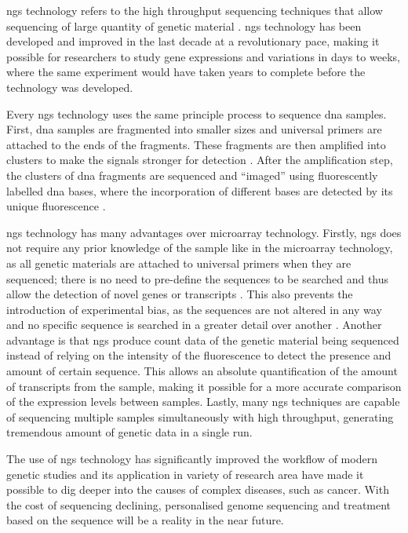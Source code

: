 \Gls{ngs} technology refers to the high throughput sequencing techniques that allow sequencing of large quantity of genetic material \citep{Metzker2010}.
\gls{ngs} technology has been developed and improved in the last decade at a revolutionary pace, making it possible for researchers to study gene expressions and variations in days to weeks, where the same experiment would have taken years to complete before the technology was developed.

Every \gls{ngs} technology uses the same principle process to sequence \acrshort{dna} samples.
First, \acrshort{dna} samples are fragmented into smaller sizes and universal primers are attached to the ends of the fragments.
These fragments are then amplified into clusters to make the signals stronger for detection \citep{Metzker2010}.
After the amplification step, the clusters of \acrshort{dna} fragments are sequenced and ``imaged'' using fluorescently labelled \acrshort{dna} bases, where the incorporation of different bases are detected by its unique fluorescence \citep{Metzker2010}.

\gls{ngs} technology has many advantages over microarray technology.
Firstly, \gls{ngs} does not require any prior knowledge of the sample like in the microarray technology, as all genetic materials are attached to universal primers when they are sequenced; there is no need to pre-define the sequences to be searched and thus allow the detection of novel genes or transcripts \citep{Hurd2009}.
This also prevents the introduction of experimental bias, as the sequences are not altered in any way and no specific sequence is searched in a greater detail over another \citep{Hurd2009}.
Another advantage is that \gls{ngs} produce count data of the genetic material being sequenced instead of relying on the intensity of the fluorescence to detect the presence and amount of certain sequence.
This allows an absolute quantification of the amount of transcripts from the sample, making it possible for a more accurate comparison of the expression levels between samples.
Lastly, many \gls{ngs} techniques are capable of sequencing multiple samples simultaneously with high throughput, generating tremendous amount of genetic data in a single run.

The use of \gls{ngs} technology has significantly improved the workflow of modern genetic studies and its application in variety of research area have made it possible to dig deeper into the causes of complex diseases, such as cancer.
With the cost of sequencing declining, personalised genome sequencing and treatment based on the sequence will be a reality in the near future.

